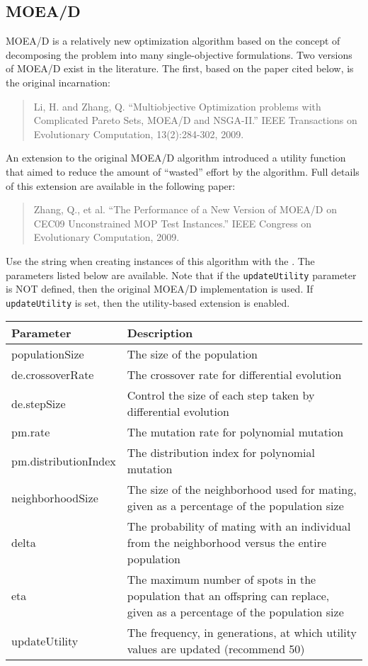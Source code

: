 \subsection{MOEA/D}
MOEA/D is a relatively new optimization algorithm based on the concept of decomposing the problem into many single-objective formulations.  Two versions of MOEA/D exist in the literature.  The first, based on the paper cited below, is the original incarnation:
\begin{quote}
Li, H. and Zhang, Q.  ``Multiobjective Optimization problems with Complicated Pareto Sets, MOEA/D and NSGA-II.''  IEEE Transactions on Evolutionary Computation, 13(2):284-302, 2009.
\end{quote}
An extension to the original MOEA/D algorithm introduced a utility function that aimed to reduce the amount of ``wasted'' effort by the algorithm.  Full details of this extension are available in the following paper:
\begin{quote}
Zhang, Q., et al. ``The Performance of a New Version of MOEA/D on CEC09 Unconstrained MOP Test Instances.'' IEEE Congress on Evolutionary Computation, 2009. 
\end{quote}
Use the string  when creating instances of this algorithm with the .  The parameters listed below are available.  Note that if the \texttt{updateUtility} parameter is NOT defined, then the original MOEA/D implementation is used.  If \texttt{updateUtility} is set, then the utility-based extension is enabled.
\newline
\newline
\begin{tabularx}{\linewidth}{lX}
  \hline
  Parameter & Description \\
  \hline
  populationSize & The size of the population \\
  de.crossoverRate & The crossover rate for differential evolution \\
  de.stepSize & Control the size of each step taken by differential evolution \\
  pm.rate & The mutation rate for polynomial mutation \\
  pm.distributionIndex & The distribution index for polynomial mutation \\
  neighborhoodSize & The size of the neighborhood used for mating, given as a percentage of the population size \\
  delta & The probability of mating with an individual from the neighborhood versus the entire population \\
  eta & The maximum number of spots in the population that an offspring can replace, given as a percentage of the population size \\
  updateUtility & The frequency, in generations, at which utility values are updated (recommend 50) \\
  \hline
\end{tabularx}
